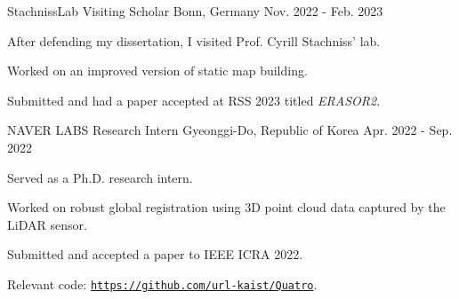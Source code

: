 \begin{cventries}
  \cventry
    {StachnissLab} %
    {Visiting Scholar} %
    {Bonn, Germany} %
    {Nov. 2022 - Feb. 2023} %
    {
      \begin{cvitems} %
        \item After defending my dissertation, I visited Prof. Cyrill Stachniss' lab.
        \item Worked on an improved version of static map building.
        \item Submitted and had a paper accepted at RSS 2023 titled \textit{ERASOR2}.
      \end{cvitems}
    }

  \cventry
    {NAVER LABS} %
    {Research Intern} %
    {Gyeonggi-Do, Republic of Korea} %
    {Apr. 2022 - Sep. 2022} %
    {
      \begin{cvitems} %
        \item Served as a Ph.D. research intern.
        \item Worked on robust global registration using 3D point cloud data captured by the LiDAR sensor.
        \item Submitted and accepted a paper to IEEE ICRA 2022.
        \item Relevant code: \href{https://github.com/url-kaist/Quatro}{\texttt{https://github.com/url-kaist/Quatro}}.
      \end{cvitems}
    }
\end{cventries}
